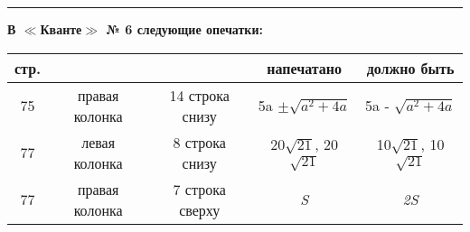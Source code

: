 \begin{center}
      \par\noindent\rule{\textwidth}{0.4pt}
      \small\textbf{В $\ll$Кванте$\gg$ № 6 следующие опечатки:}
   \end{center}
   \begin{center}
     \begin{tabular}{ |c|c|c|c|c| } 
       стр. &  &  & напечатано & должно быть\\
       \hline
       75 &правая колонка & 14 строка снизу & 5a $\pm\sqrt{a^2 + 4a}$ & 5a - $\sqrt{a^2 + 4a}$\\
       77 & левая колонка & 8 строка снизу & 20$\sqrt{21}$, 20$\sqrt{21}$ & 10$\sqrt{21}$, 10$\sqrt{21}$ \\
       77 & правая колонка & 7 строка сверху & \textit{S} & \textit{2S}\\
     \end{tabular}
 \end{center}
